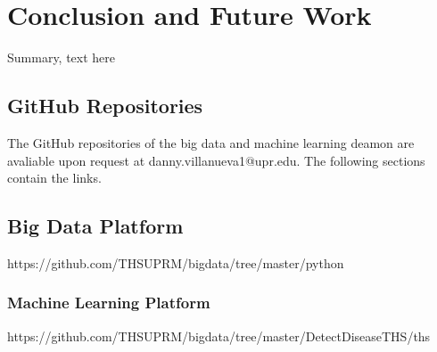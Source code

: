 \documentclass[12pt]{report}
\begin{document}
\chapter{Conclusion and Future Work} \label{chapter 6}
Summary, text here


 

\begin{appendices}
\chapter{GitHub Repositories}
The GitHub repositories of the big data and machine learning deamon are avaliable upon request at danny.villanueva1@upr.edu. The following sections contain the links.

\section{Big Data Platform}
https://github.com/THSUPRM/bigdata/tree/master/python

\subsection{Machine Learning Platform}
https://github.com/THSUPRM/bigdata/tree/master/DetectDiseaseTHS/ths
\end{appendices}
\end{document}
